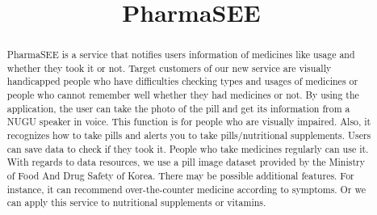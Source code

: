 \documentclass[conference]{IEEEtran}
\begin{document}
\title{PharmaSEE\\
}

\author{
\and
{}
\and
{}
\and
{}
\and
{}
\and
\IEEEauthorblockN{}
}

\maketitle

\begin{abstract}
PharmaSEE is a service that notifies users information of medicines like usage and whether they took it or not. Target customers of our new service are visually handicapped people who have difficulties checking types and usages of medicines or people who cannot remember well whether they had medicines or not. By using the application, the user can take the photo of the pill and get its information from a NUGU speaker in voice. This function is for people who are visually impaired. Also, it recognizes how to take pills and alerts you to take pills/nutritional supplements. Users can save data to check if they took it. People who take medicines regularly can use it. With regards to data resources, we use a pill image dataset provided by the Ministry of Food And Drug Safety of Korea. There may be possible additional features. For instance, it can recommend over-the-counter medicine according to symptoms. Or we can apply this service to nutritional supplements or vitamins.
\end{abstract}
\end{document}
